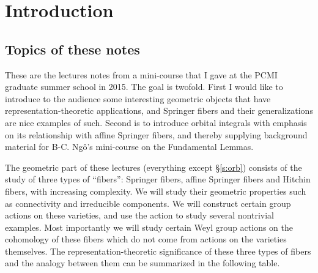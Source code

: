 \begin{abstract}
These are the expanded lecture notes from the author's mini-course during the graduate summer school of the Park City Math Institute in 2015. The main topics covered are: geometry of Springer fibers, affine Springer fibers and Hitchin fibers; representations of (affine) Weyl groups arising from these objects; relation between affine Springer fibers and orbital integrals.
\end{abstract}

%    
%    
\maketitle

\tableofcontents

%    
%    

\section{Introduction}

\subsection{Topics of these notes} These are the lectures notes from a mini-course that I gave at the PCMI graduate summer school in 2015. The goal is twofold. First I would like to introduce to the audience some interesting geometric objects that have representation-theoretic applications, and Springer fibers and their generalizations are nice examples of such. Second is to introduce orbital integrals with emphasis on its relationship with affine Springer fibers, and thereby supplying background material for B-C. Ng\^o's mini-course on the Fundamental Lemmas.

The geometric part of these lectures (everything except \S\ref{s:orb}) consists of the study of three types of ``fibers'': Springer fibers, affine Springer fibers and Hitchin fibers, with increasing complexity. We will study their geometric properties such as connectivity and irreducible components. We will construct certain group actions on these varieties, and use the action to study several nontrivial examples. Most importantly we will study certain Weyl group actions on the cohomology of these fibers which do not come from actions on the varieties themselves. The representation-theoretic significance of these three types of fibers and the analogy between them can be summarized in the following table.

